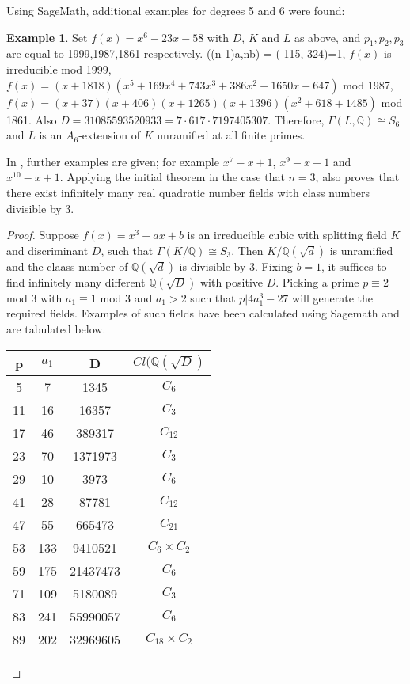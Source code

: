 \documentclass[12pt]{extarticle}
\newcommand{\Q}{\mathbb{Q}}
\newcommand{\<}{\langle}
\renewcommand{\>}{\rangle}
\theoremstyle{definition}
\newtheorem*{example}{Example}
\begin{document}
Using SageMath, additional examples for degrees 5 and 6 were found:
\begin{example}
Set $f(x)= x^6-23x-58$ with $D$, $K$ and $L$ as above, and $p_1,p_2,p_3$ are equal to 1999,1987,1861 respectively. ((n-1)a,nb) = (-115,-324)=1, $f(x)$ is irreducible mod 1999, $f(x)=(x + 1818)(x^5 + 169x^4 + 743x^3+386x^2+1650x+647)$ mod 1987, $f(x)=(x + 37)(x + 406)(x + 1265)(x+1396)(x^2 + 618 + 1485)$ mod 1861. Also $D = 31085593520933 = 7 \cdot 617 \cdot 7197405307$. Therefore, $\Gamma(L,\Q) \cong S_6$ and $L$ is an $A_6$-extension of $K$ unramified at all finite primes.
\end{example}
In \cite{uchida1970}, further examples are given; for example $x^7-x+1$, $x^9-x+1$ and $x^{10}-x+1$. 
Applying the initial theorem in the case that $n=3$, \cite{uchida1970} also proves that there exist infinitely many real quadratic number fields with class numbers divisible by 3. 
\begin{proof}
Suppose $f(x) = x^3+ax+b$ is an irreducible cubic with splitting field $K$ and discriminant $D$, such that $\Gamma(K/\Q) \cong S_3$. Then $K/\Q(\sqrt{d})$ is unramified and the claass number of $\Q(\sqrt{d})$ is divisible by 3.  Fixing $b=1$, it suffices to find infinitely many different $\Q(\sqrt{D})$ with positive $D$. Picking a prime $p \equiv 2$ mod 3 with $a_1 \equiv 1$ mod 3 and $a_1 > 2$ such that $p | 4a_1^3 - 27$ will generate the required fields. Examples of such fields have been calculated using Sagemath and are tabulated below.
\begin{center}
 \begin{tabular}{| c | c | c | c |}
 \hline
p & $a_1$ & D & $Cl(\Q(\sqrt{D})$  \\ 
\hline
5 &  7 & 1345 & $C_{6}$ \\
\hline
11 &  16 & 16357 & $C_{3}$ \\
\hline
17 &  46 & 389317 & $C_{12}$ \\
\hline
23 &  70 & 1371973 & $C_{3}$ \\
\hline
29 &  10 & 3973 & $C_{6}$ \\
\hline
41 &  28 & 87781 & $C_{12}$ \\
\hline
47 &  55 & 665473 & $C_{21}$ \\
\hline
53 &  133 & 9410521 & $C_{6} \times C_{2}$ \\
\hline
59 &  175 & 21437473 & $C_{6}$ \\
\hline
71 &  109 & 5180089 & $C_{3}$ \\
\hline
83 &  241 & 55990057 & $C_{6}$ \\
\hline
89 &  202 & 32969605 & $C_{18} \times C_{2}$ \\
\hline
\end{tabular}
\end{center}
\end{proof}
\end{document}
